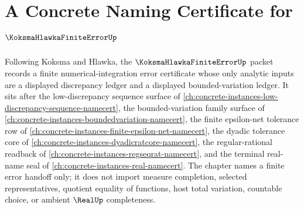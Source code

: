 \chapter{A Concrete Naming Certificate for $\KoksmaHlawkaFiniteErrorUp$}
\label{ch:concrete-instances-koksma-hlawka-finite-error-namecert}

Following Koksma and Hlawka, the $\KoksmaHlawkaFiniteErrorUp$ packet records a finite numerical-integration error certificate whose only analytic inputs are a displayed discrepancy ledger and a displayed bounded-variation ledger. It sits after the low-discrepancy sequence surface of \autoref{ch:concrete-instances-low-discrepancy-sequence-namecert}, the bounded-variation family surface of \autoref{ch:concrete-instances-boundedvariation-namecert}, the finite epsilon-net tolerance row of \autoref{ch:concrete-instances-finite-epsilon-net-namecert}, the dyadic tolerance core of \autoref{ch:concrete-instances-dyadicratcore-namecert}, the regular-rational readback of \autoref{ch:concrete-instances-regseqrat-namecert}, and the terminal real-name seal of \autoref{ch:concrete-instances-real-namecert}. The chapter names a finite error handoff only; it does not import measure completion, selected representatives, quotient equality of functions, host total variation, countable choice, or ambient $\RealUp$ completeness.

